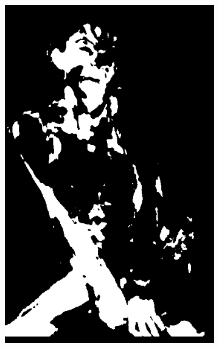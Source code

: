 \begin{figure}[h]
{\begin{subfigure}[b]{0.23\textwidth}
         \includegraphics[width=\textwidth]{images/results/cross/linda_rgb_hgr_sch_skinny120.png}
     \end{subfigure}
    \hfill
     \begin{subfigure}[b]{0.23\textwidth}
         \centering

\end{subfigure}}
\end{figure}
